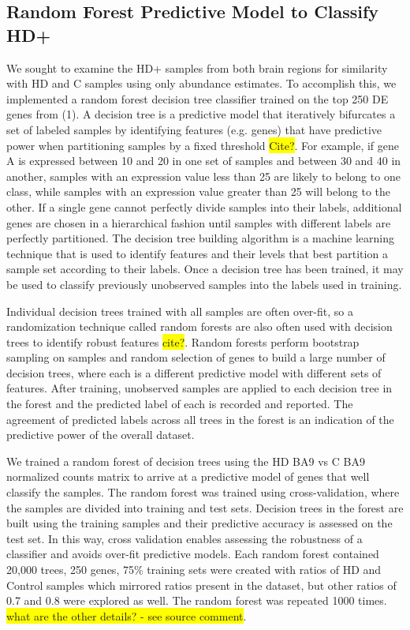 \documentclass[fleqn,10pt,table]{wlscirep}
\newcommand{\todo}[1]{\colorbox{yellow}{#1}}
\begin{document}
\subsection{Random Forest Predictive Model to Classify HD+}

We sought to examine the HD+ samples from both brain regions for similarity with HD and C samples using only abundance estimates.
To accomplish this, we implemented a random forest decision tree classifier trained on the top 250 DE genes from (1).
A decision tree is a predictive model that iteratively bifurcates a set of labeled samples by identifying features (e.g. genes) that have predictive power when partitioning samples by a fixed threshold \todo{Cite?}.
For example, if gene A is expressed between 10 and 20 in one set of samples and between 30 and 40 in another, samples with an expression value less than 25 are likely to belong to one class, while samples with an expression value greater than 25 will belong to the other.
If a single gene cannot perfectly divide samples into their labels, additional genes are chosen in a hierarchical fashion until samples with different labels are perfectly partitioned.
The decision tree building algorithm is a machine learning technique that is used to identify features and their levels that best partition a sample set according to their labels.
Once a decision tree has been trained, it may be used to classify previously unobserved samples into the labels used in training.

Individual decision trees trained with all samples are often over-fit, so a randomization technique called random forests are also often used with decision trees to identify robust features \todo{cite?}.
Random forests perform bootstrap sampling on samples and random selection of genes to build a large number of decision trees, where each is a different predictive model with different sets of features.
After training, unobserved samples are applied to each decision tree in the forest and the predicted label of each is recorded and reported.
The agreement of predicted labels across all trees in the forest is an indication of the predictive power of the overall dataset.

We trained a random forest of decision trees using the HD BA9 vs C BA9 normalized counts matrix to arrive at a predictive model of genes that well classify the samples.
The random forest was trained using cross-validation, where the samples are divided into training and test sets.
Decision trees in the forest are built using the training samples and their predictive accuracy is assessed on the test set.
In this way, cross validation enables assessing the robustness of a classifier and avoids over-fit predictive models.
Each random forest contained 20,000 trees, 250 genes, 75\% training sets were created with ratios of HD and Control samples which mirrored ratios present in the dataset, but other ratios of 0.7 and 0.8 were explored
as well. The random forest was repeated 1000 times. \todo{what are the other details? - see source comment}.
\end{document}
